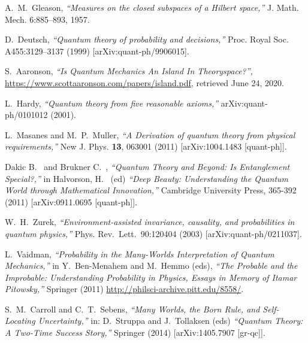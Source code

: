 \documentclass[11pt,twoside,A4]{article}
\begin{document}
\begin{thebibliography}{99}
\small{

A.~M.~Gleason, {\sl ``Measures on the closed subspaces of a Hilbert space,''} J. Math. Mech. 6:885–893, 1957.

 D.~Deutsch, {\sl ``Quantum theory of probability and decisions,''} Proc. Royal Soc. A455:3129–3137 (1999)
[arXiv:quant-ph/9906015].



S.~Aaronson, {\sl ``Is Quantum Mechanics An Island In Theoryspace?'',} {\url{https://www.scottaaronson.com/papers/island.pdf}}, retrieved June 24, 2020. 

 L.~Hardy, {\sl ``Quantum theory from five reasonable axioms,''} arXiv:quant-ph/0101012 (2001). 

L.~Masanes and M.~P.~Muller,
{\sl ``A Derivation of quantum theory from physical requirements,''}
New J. Phys. \textbf{13}, 063001 (2011)
[arXiv:1004.1483 [quant-ph]].

Dakic B.~ and Brukner C.~, 
{\sl ``Quantum Theory and Beyond: Is Entanglement Special?,''} in Halvorson, H.~ (ed) {\sl ``Deep Beauty: Understanding the Quantum World through Mathematical Innovation,''} Cambridge University Press, 365-392 (2011) [arXiv:0911.0695 [quant-ph]].

 W.~H.~Zurek, {\sl ``Environment-assisted invariance, causality, and probabilities in quantum physics,''} Phys.
Rev.\ Lett.\ 90:120404 (2003) [arXiv:quant-ph/0211037].


 L.~Vaidman, {\sl ``Probability in the Many-Worlds Interpretation of Quantum Mechanics,''}
in Y.~Ben-Menahem and M.~Hemmo (eds), {\sl ``The Probable and the Improbable: Understanding Probability in Physics, Essays in Memory of Itamar Pitowsky,''} Springer (2011) {\url{http://philsci-archive.pitt.edu/8558/}}.

S.~M.~Carroll and C.~T.~Sebens,
{\sl ``Many Worlds, the Born Rule, and Self-Locating Uncertainty,''}  in: D.~Struppa and J.~Tollaksen (eds) {\sl ``Quantum Theory: A Two-Time Success Story,''} Springer (2014)
[arXiv:1405.7907 [gr-qc]].

}
\end{thebibliography}
\end{document}
